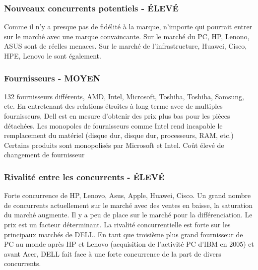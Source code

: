 \documentclass{bredele} %
\begin{document}
                    \subsubsection*{Nouveaux concurrents potentiels - ÉLEVÉ}
                    Comme il n'y a presque pas de fidélité à la marque, n'importe qui pourrait entrer sur le marché avec une marque convaincante. Sur le marché du PC, HP, Lenono, ASUS sont de réelles menaces. Sur le marché de l’infrastructure, Huawei, Cisco, HPE, Lenovo le sont également.
                    \subsubsection*{Fournisseurs - MOYEN}
                    132 fournisseurs différents, AMD, Intel, Microsoft, Toshiba, Toshiba, Samsung, etc.
    \newline
    En entretenant des relations étroites à long terme avec de multiples fournisseurs, Dell est en mesure d'obtenir des prix plus bas pour les pièces détachées.
    \newline
    Les monopoles de fournisseurs comme Intel rend incapable le remplacement du matériel (disque dur, disque dur, processeurs, RAM, etc.)
    \newline
    Certains produits sont monopolisés par Microsoft et Intel.
    \newline
    Coût élevé de changement de fournisseur
                    \subsubsection*{Rivalité entre les concurrents - ÉLEVÉ}
                    Forte concurrence de HP, Lenovo, Asus, Apple, Huawei, Cisco.
    \newline
    Un grand nombre de concurrents actuellement sur le marché avec des ventes en baisse, la saturation du marché augmente. Il y a peu de place sur le marché pour la différenciation. Le prix est un facteur déterminant.
    \newline
    La rivalité concurrentielle est forte sur les principaux marchés de DELL. En tant que troisième plus grand fournisseur de PC au monde après HP et Lenovo (acquisition de l'activité PC d'IBM en 2005) et avant Acer, DELL fait face à une forte concurrence de la part de divers concurrents.
\end{document}
